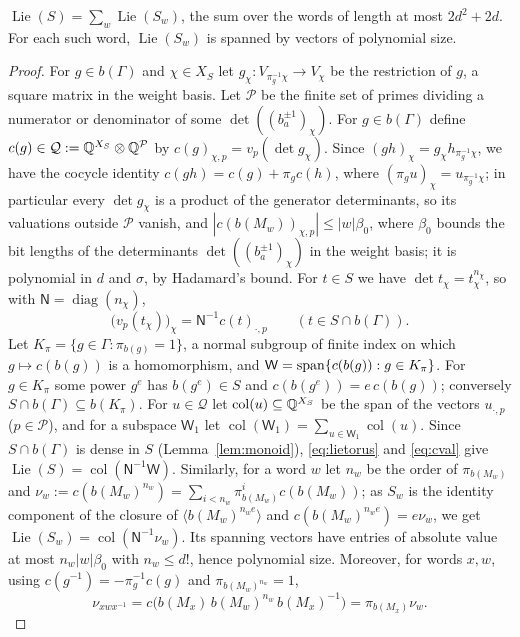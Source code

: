 \begin{lemma}\label{lem:torus}
$\operatorname{Lie}(S)=\sum_w\operatorname{Lie}(S_w)$, the sum over the words of length at most $2d^2+2d$. For each such
word, $\operatorname{Lie}(S_w)$ is spanned by vectors of polynomial size.
\end{lemma}
\begin{proof}
For $g\in b(\Gamma)$ and $\chi\in X_S$ let $g_\chi:V_{\pi_g^{-1}\chi}\to V_\chi$ be the restriction
of $g$, a square matrix in the weight basis. Let $\mathcal P$ be the finite set of primes dividing a
numerator or denominator of some $\det((b_a^{\pm1})_\chi)$. For $g\in b(\Gamma)$ define
$c(g)\in\mathcal Q:=\mathbb{Q}^{X_S}\otimes\mathbb{Q}^{\mathcal P}$ by $c(g)_{\chi,p}=v_p(\det g_\chi)$. Since
$(gh)_\chi=g_\chi h_{\pi_g^{-1}\chi}$, we have the cocycle identity $c(gh)=c(g)+\pi_gc(h)$, where
$(\pi_gu)_\chi=u_{\pi_g^{-1}\chi}$; in particular every $\det g_\chi$ is a product of the generator
determinants, so its valuations outside $\mathcal P$ vanish, and $|c(b(M_w))_{\chi,p}|\le|w|\beta_0$, where
$\beta_0$ bounds the bit lengths of the determinants $\det((b_a^{\pm1})_\chi)$ in the weight basis; it is
polynomial in $d$ and $\sigma$, by Hadamard's bound. For
$t\in S$ we have $\det t_\chi=t_\chi^{n_\chi}$, so with $\mathsf N=\operatorname{diag}(n_\chi)$,
\begin{equation}\label{eq:cval}
\bigl(v_p(t_\chi)\bigr)_\chi=\mathsf N^{-1}c(t)_{\cdot,p}\qquad(t\in S\cap b(\Gamma)).
\end{equation}
Let $K_\pi=\{g\in\Gamma:\pi_{b(g)}=1\}$, a normal subgroup of finite index on which $g\mapsto c(b(g))$ is
a homomorphism, and $\mathsf W=\operatorname{span}\{c(b(g)):g\in K_\pi\}$. For $g\in K_\pi$ some power $g^e$ has $b(g^e)\in S$ and
$c(b(g^e))=e\,c(b(g))$; conversely $S\cap b(\Gamma)\subseteq b(K_\pi)$. For $u\in\mathcal Q$ let
$\operatorname{col}(u)\subseteq\mathbb{Q}^{X_S}$ be the span of the vectors $u_{\cdot,p}$ ($p\in\mathcal P$), and for a
subspace $\mathsf W_1$ let $\operatorname{col}(\mathsf W_1)=\sum_{u\in\mathsf W_1}\operatorname{col}(u)$. Since $S\cap b(\Gamma)$ is dense in $S$
(Lemma~\ref{lem:monoid}), \eqref{eq:lietorus} and \eqref{eq:cval} give
$\operatorname{Lie}(S)=\operatorname{col}(\mathsf N^{-1}\mathsf W)$. Similarly, for a word $w$ let $n_w$ be the order of
$\pi_{b(M_w)}$ and $\nu_w:=c(b(M_w)^{n_w})=\sum_{i<n_w}\pi_{b(M_w)}^ic(b(M_w))$; as
$S_w$ is the identity component of the closure of $\langle b(M_w)^{n_we}\rangle$ and
$c(b(M_w)^{n_we})=e\nu_w$, we get $\operatorname{Lie}(S_w)=\operatorname{col}(\mathsf N^{-1}\nu_w)$. Its spanning vectors
have entries of absolute value at most $n_w|w|\beta_0$ with $n_w\le d!$, hence polynomial size. Moreover, for
words $x,w$, using $c(g^{-1})=-\pi_g^{-1}c(g)$ and $\pi_{b(M_w)^{n_w}}=1$,
\begin{equation}\label{eq:conjnu}
\nu_{xwx^{-1}}=c\bigl(b(M_x)\,b(M_w)^{n_w}\,b(M_x)^{-1}\bigr)=\pi_{b(M_x)}\nu_w .
\end{equation}


\end{proof}
